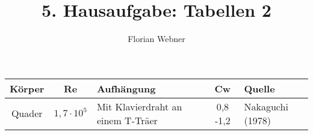 \documentclass[10pt]{article}
\title{5. Hausaufgabe: Tabellen 2}
\author{Florian Webner}
\begin{document}
\maketitle




\begin{tabularx}{\linewidth}{ccp{4cm}c p{4cm}}
\toprule
Körper	&  Re & Aufhängung &	Cw	&Quelle\\	
\midrule
Quader	&	$1,7 \cdot 10^5$	& Mit Klavierdraht an einem T-Träer & 0,8 -1,2	&	Nakaguchi (1978) \\
\bottomrule

\end{tabularx}





	
\end{document}
